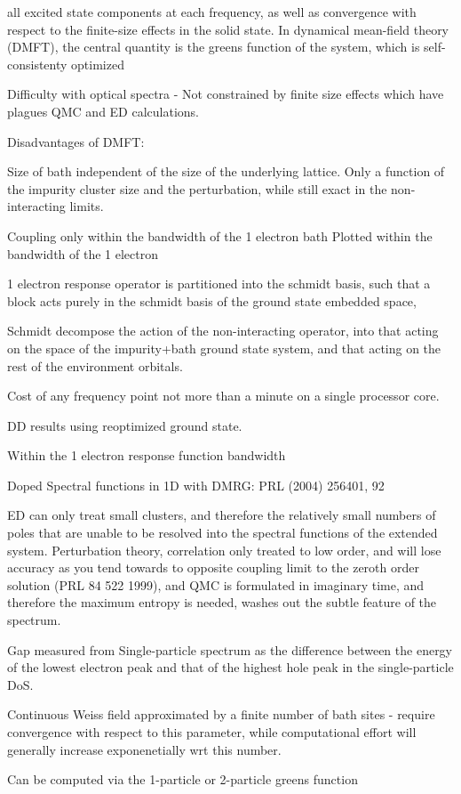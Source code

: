\documentclass[aps,showpacs,twocolumn,nobibnotes]{revtex4}
\begin{document}
all excited state components at each frequency, as well as 
convergence with respect to the finite-size effects in the solid state. In dynamical mean-field theory (DMFT), the central quantity 
is the greens function of the system, which is self-consistenty optimized 

Difficulty with optical spectra - 
Not constrained by finite size effects which have plagues QMC and ED calculations.

Disadvantages of DMFT:

Size of bath independent of the size of the underlying lattice. Only a function of the impurity cluster size and the perturbation, while still exact in the non-interacting limits.

Coupling only within the bandwidth of the 1 electron bath
Plotted within the bandwidth of the 1 electron 

1 electron response operator is partitioned into the schmidt basis, such that a block acts purely in the schmidt basis of the ground state embedded space, 

Schmidt decompose the action of the non-interacting operator, into that acting on the space of the impurity+bath ground state system, and that acting on the rest of the environment orbitals.

Cost of any frequency point not more than a minute on a single processor core.

DD results using reoptimized ground state.

Within the 1 electron response function bandwidth

Doped Spectral functions in 1D with DMRG: PRL (2004) 256401, 92

ED can only treat small clusters, and therefore the relatively small numbers of poles that are unable to be resolved into the spectral functions of the extended system. Perturbation theory, 
correlation only treated to low order, and will 
lose accuracy as you tend towards to opposite coupling limit to the zeroth order solution (PRL 84 522 1999), and QMC is formulated in imaginary time, and therefore the maximum entropy is needed,
washes out the subtle feature of the spectrum.


Gap measured from Single-particle spectrum as the difference between the energy of the lowest electron peak and that of the highest hole peak in the single-particle DoS.

Continuous Weiss field approximated by a finite number of bath sites - require convergence with respect to this parameter, while computational effort will generally increase exponenetially wrt this number.

Can be computed via the 1-particle or 2-particle greens function

%
\end{document}
